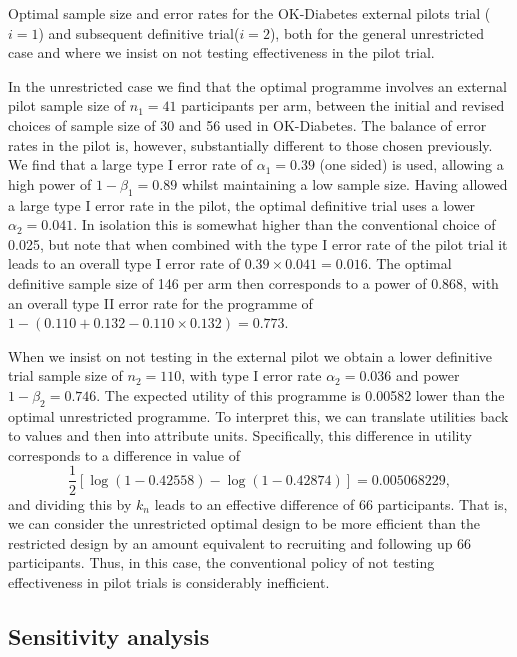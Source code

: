 \documentclass[sagev, Crown]{sagej} %
\begin{document}
\begin{table}
\small\sf\centering
\caption{Optimal sample size and error rates for the OK-Diabetes external pilots trial ($i = 1$) and subsequent definitive trial($i = 2$), both for the general unrestricted case and where we insist on not testing effectiveness in the pilot trial.}

\label{tab:ill}
\end{table}

In the unrestricted case we find that the optimal programme involves an external pilot sample size of $n_1 = 41$ participants per arm, between the initial and revised choices of sample size of 30 and 56 used in OK-Diabetes. The balance of error rates in the pilot is, however, substantially different to those chosen previously. We find that a large type I error rate of $\alpha_1 = 0.39$ (one sided) is used, allowing a high power of $1-\beta_1 = 0.89$ whilst maintaining a low sample size. Having allowed a large type I error rate in the pilot, the optimal definitive trial uses a lower $\alpha_2 = 0.041$. In isolation this is somewhat higher than the conventional choice of 0.025, but note that when combined with the type I error rate of the pilot trial it leads to an overall type I error rate of $0.39 \times 0.041 = 0.016$. The optimal definitive sample size of 146 per arm then corresponds to a power of 0.868, with an overall type II error rate for the programme of $1-(0.110 + 0.132 - 0.110 \times 0.132) = 0.773$.

When we insist on not testing in the external pilot we obtain a lower definitive trial sample size of $n_2 = 110$, with type I error rate $\alpha_2 = 0.036$ and power $1 - \beta_2 = 0.746$. The expected utility of this programme is 0.00582 lower than the optimal unrestricted programme. To interpret this, we can translate utilities back to values and then into attribute units. Specifically, this difference in utility corresponds to a difference in value of
$$
\frac{1}{2}\left[ \log(1-0.42558) - \log(1-0.42874) \right] = 0.005068229,
$$
and dividing this by $k_n$ leads to an effective difference of 66 participants. That is, we can consider the unrestricted optimal design to be more efficient than the restricted design by an amount equivalent to recruiting and following up 66 participants. Thus, in this case, the conventional policy of not testing effectiveness in pilot trials is considerably inefficient.

\subsection{Sensitivity analysis}\label{sec:sensitivity}
\end{document}
